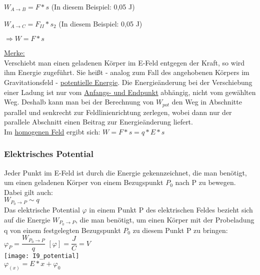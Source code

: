 \documentclass[12pt]{scrartcl}
\begin{document}
\begin{flushleft}
			\vspace{2mm}
			$ W_{A \rightarrow B} = F \ast s $ (In diesem Beispiel: 0,05 J)
			
			\vspace{2mm}
			$ W_{A \rightarrow C} = F_{II} \ast s_{2} $ (In diesem Beispiel: 0,05 J)
			
			\vspace{2mm}
			$ \Rightarrow W = F \ast s $	
			
			\vspace{2mm}
			\underline{Merke:} \\
			Verschiebt man einen geladenen Körper im E-Feld entgegen der Kraft, so wird ihm Energie zugeführt. Sie heißt - analog zum Fall des angehobenen Körpers im Gravitationsfeld - \underline{potentielle Energie}. Die Energieänderung bei der Verschiebung einer Ladung ist nur vom \underline{Anfangs- und Endpunkt} abhängig, nicht vom gewählten Weg. Deshalb kann man bei der Berechnung von $W_{pot}$ den Weg in Abschnitte parallel und senkrecht zur Feldlinienrichtung zerlegen, wobei dann nur der parallele Abschnitt einen Beitrag zur Energieänderung liefert. \\
			Im \underline{homogenen Feld} ergibt sich: $ W = F \ast s = q \ast E \ast s $ 
			
			\subsubsection{Elektrisches Potential}
			Jeder Punkt im E-Feld ist durch die Energie gekennzeichnet, die man benötigt, um einen geladenen Körper von einem Bezugspunkt $P_{0}$ nach P zu bewegen. Dabei gilt auch:
			\vspace{2mm} \\
			$ W_{P_{0} \rightarrow P} \sim q $
			\vspace{2mm} \\
			Das elektrische Potential $\varphi$ in einem Punkt P des elektrischen Feldes bezieht sich auf die Energie $W_{P_{0} \rightarrow P}$, die man benötigt, um einen Körper mit der Probeladung q von einem festgelegten Bezugspunkt $P_{0}$ zu diesem Punkt P zu bringen:
			\vspace{2mm} \\
			$ \varphi_{P} = \dfrac{W_{P_{0} \rightarrow P}}{q} $ \hspace{5mm} $ [\varphi] = \dfrac{J}{C} = V $
			\vspace{2mm} \\
			\texttt{[image: I9\_potential]}
			\vspace{2mm} \\
			$\varphi_{(x)} = E \ast x + \varphi_{0}$ 
			

\end{flushleft}
\end{document}
